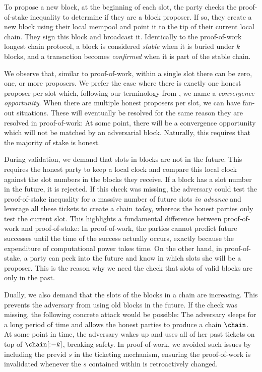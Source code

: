 To propose a new block,
at the beginning of each slot, the party checks the proof-of-stake inequality to determine if they
are a block proposer. If so, they create a new block using their local mempool and point it to the
tip of their current local chain. They sign this block and broadcast it. Identically to the
proof-of-work longest chain protocol, a block is considered
\emph{stable} when it is buried under $k$ blocks, and a transaction becomes \emph{confirmed} when it is part
of the stable chain.

We observe that, similar to proof-of-work, within a single slot there can be zero, one, or more
proposers. We prefer the case where there is exactly one honest proposer per slot which, following
our terminology from , we name a \emph{convergence opportunity}.
When there are multiple
honest proposers per slot, we can have fan-out situations. These will eventually be resolved for the
same reason they are resolved in proof-of-work: At some point, there will be a convergence
opportunity which will not be matched by an adversarial block. Naturally, this requires that
the majority of stake is honest.

During validation, we demand that slots in blocks are not in the future. This requires the
honest party to keep a local clock and compare this local clock against the slot numbers in the
blocks they receive. If a block has a slot number in the future, it is rejected. If this check
was missing, the adversary could test the proof-of-stake inequality for a massive number
of future slots \emph{in advance} and leverage
all these tickets to create a chain \emph{today}, whereas the honest parties only test the
current slot.
This highlights a fundamental difference between
proof-of-work and proof-of-stake: In proof-of-work, the parties cannot predict future successes
until the time of the success actually occurs, exactly because the expenditure of computational
power takes time. On the other hand, in proof-of-stake, a party can peek into the future and
know in which slots she will be a proposer. This is the reason why we need the check that
slots of valid blocks are only in the past.

Dually, we also demand that the slots of the blocks in a chain are increasing.
This prevents the adversary from using old blocks in the future. If the check was missing, the following
concrete attack would be possible: The adversary sleeps for a long period of time and allows the honest parties
to produce a chain $\chain$. At some point in time, the adversary wakes up and uses all of her past
tickets on top of $\chain[{:}{-k}]$, breaking safety. In proof-of-work, we avoided such issues
by including the previd $s$ in the ticketing mechanism, ensuring the proof-of-work is invalidated whenever the
$s$ contained within is retroactively changed.

